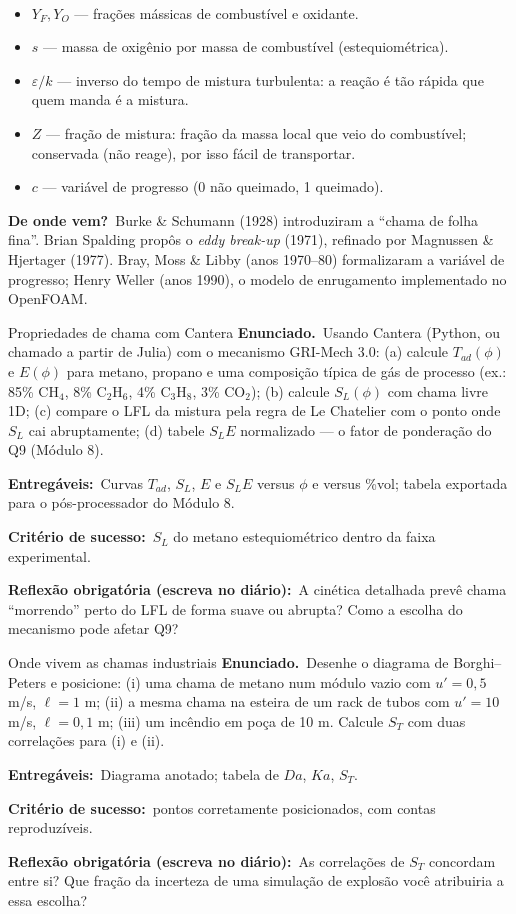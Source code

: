 \documentclass[10pt,a4paper,twocolumn,openany]{report}
\newcommand{\lead}[2]{\par\medskip\noindent{\color{#1}\bfseries #2}\ }
\newenvironment{dicionario}[1][Dicionário da equação]{\lead{azul}{#1.}\small}{\par\medskip}
\newcommand{\origem}{\par\smallskip\noindent\textcolor{azul}{\textbf{De onde vem?}}\ }
\newcommand{\enunciado}{\noindent\textbf{Enunciado.}\ }
\newcommand{\entregaveis}{\par\medskip\noindent\textbf{Entregáveis:}}
\newcommand{\criterio}{\par\medskip\noindent\textbf{Critério de sucesso:}\ }
\newcommand{\reflexao}{\par\medskip\noindent\textbf{Reflexão obrigatória (escreva no diário):}}
\begin{document}
\begin{dicionario}[Dicionário da equação: modelos de combustão]
\begin{itemize}[leftmargin=*,nosep]
  \item $Y_F,Y_O$ --- frações mássicas de combustível e oxidante.
  \item $s$ --- massa de oxigênio por massa de combustível (estequiométrica).
  \item $\varepsilon/k$ --- inverso do tempo de mistura turbulenta: a reação
        é tão rápida que quem manda é a mistura.
  \item $Z$ --- fração de mistura: fração da massa local que veio do
        combustível; conservada (não reage), por isso fácil de transportar.
  \item $c$ --- variável de progresso (0 não queimado, 1 queimado).
\end{itemize}
\origem Burke \& Schumann (1928) introduziram a ``chama de folha fina''.
Brian Spalding propôs o \emph{eddy break-up} (1971), refinado por
Magnussen \& Hjertager (1977). Bray, Moss \& Libby (anos 1970--80) formalizaram
a variável de progresso; Henry Weller (anos 1990), o modelo de enrugamento
implementado no OpenFOAM.
\end{dicionario}


\begin{tarefa}{Propriedades de chama com Cantera}
\enunciado Usando Cantera (Python, ou chamado a partir de Julia) com o
mecanismo GRI-Mech 3.0: (a) calcule $T_{ad}(\phi)$ e $E(\phi)$ para metano,
propano e uma composição típica de gás de processo (ex.: 85\% CH$_4$, 8\%
C$_2$H$_6$, 4\% C$_3$H$_8$, 3\% CO$_2$); (b) calcule $S_L(\phi)$ com chama
livre 1D; (c) compare o LFL da mistura pela regra de Le Chatelier com o
ponto onde $S_L$ cai abruptamente; (d) tabele $S_L E$ normalizado ---
o fator de ponderação do Q9 (Módulo 8).
\entregaveis\ Curvas $T_{ad}$, $S_L$, $E$ e $S_L E$ versus $\phi$ e versus
\%vol; tabela exportada para o pós-processador do Módulo 8.
\criterio $S_L$ do metano estequiométrico dentro da faixa experimental.
\reflexao\ A cinética detalhada prevê chama ``morrendo'' perto do LFL de
forma suave ou abrupta? Como a escolha do mecanismo pode afetar Q9?
\end{tarefa}

\begin{tarefa}{Onde vivem as chamas industriais}
\enunciado Desenhe o diagrama de Borghi--Peters e posicione: (i) uma chama
de metano num módulo vazio com $u'=0{,}5$ m/s, $\ell=1$ m; (ii) a mesma chama
na esteira de um rack de tubos com $u'=10$ m/s, $\ell=0{,}1$ m; (iii) um
incêndio em poça de 10 m. Calcule $S_T$ com duas correlações para (i) e (ii).
\entregaveis\ Diagrama anotado; tabela de $Da$, $Ka$, $S_T$.
\criterio pontos corretamente posicionados, com contas reproduzíveis.
\reflexao\ As correlações de $S_T$ concordam entre si? Que fração da
incerteza de uma simulação de explosão você atribuiria a essa escolha?
\end{tarefa}
\end{document}
